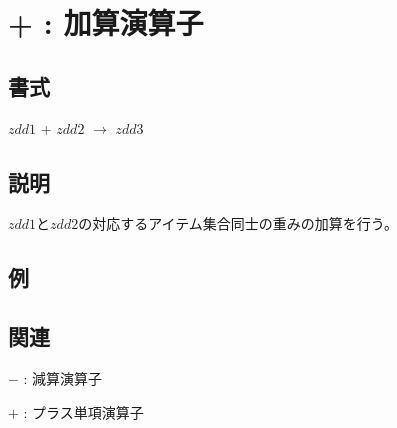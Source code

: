 
\section{+ : 加算演算子\label{sect:plus}}
\subsection*{書式}
$zdd1$ + $zdd2$ $\rightarrow$ $zdd3$

\subsection*{説明}
$zdd1$と$zdd2$の対応するアイテム集合同士の重みの加算を行う。

\subsection*{例}


\subsection*{関連}
\hyperref[sect:minus]{$-$} : 減算演算子

\hyperref[sect:plus_op]{$+$} : プラス単項演算子

